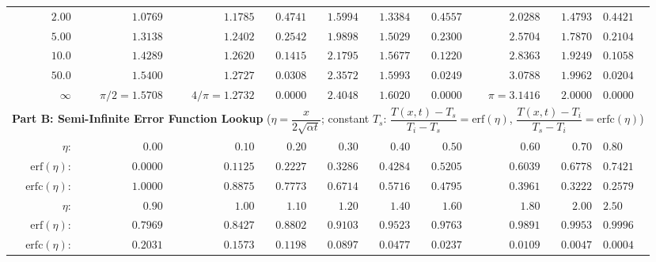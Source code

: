 \begin{minipage}{\linewidth}
\begin{tabularx}{\linewidth}{@{}r r r r r r r r r X@{}}
$2.00$ & $1.0769$ & $1.1785$ & $0.4741$ & $1.5994$ & $1.3384$ & $0.4557$ & $2.0288$ & $1.4793$ & $0.4421$ \\
$5.00$ & $1.3138$ & $1.2402$ & $0.2542$ & $1.9898$ & $1.5029$ & $0.2300$ & $2.5704$ & $1.7870$ & $0.2104$ \\
$10.0$ & $1.4289$ & $1.2620$ & $0.1415$ & $2.1795$ & $1.5677$ & $0.1220$ & $2.8363$ & $1.9249$ & $0.1058$ \\
$50.0$ & $1.5400$ & $1.2727$ & $0.0308$ & $2.3572$ & $1.5993$ & $0.0249$ & $3.0788$ & $1.9962$ & $0.0204$ \\
$\infty$ & $\pi/2=1.5708$ & $4/\pi=1.2732$ & $0.0000$ & $2.4048$ & $1.6020$ & $0.0000$ & $\pi=3.1416$ & $2.0000$ & $0.0000$ \\
\midrule
\multicolumn{10}{l}{\textbf{Part B: Semi-Infinite Error Function Lookup} ($\eta = \dfrac{x}{2\sqrt{\alpha t}}$; constant $T_s$: $\dfrac{T(x,t) - T_s}{T_i - T_s} = \mathrm{erf}(\eta)$, $\dfrac{T(x,t) - T_i}{T_s - T_i} = \mathrm{erfc}(\eta)$)} \\
$\eta$: & $0.00$ & $0.10$ & $0.20$ & $0.30$ & $0.40$ & $0.50$ & $0.60$ & $0.70$ & $0.80$ \\
$\mathrm{erf}(\eta)$: & $0.0000$ & $0.1125$ & $0.2227$ & $0.3286$ & $0.4284$ & $0.5205$ & $0.6039$ & $0.6778$ & $0.7421$ \\
$\mathrm{erfc}(\eta)$: & $1.0000$ & $0.8875$ & $0.7773$ & $0.6714$ & $0.5716$ & $0.4795$ & $0.3961$ & $0.3222$ & $0.2579$ \\
\midrule
$\eta$: & $0.90$ & $1.00$ & $1.10$ & $1.20$ & $1.40$ & $1.60$ & $1.80$ & $2.00$ & $2.50$ \\
$\mathrm{erf}(\eta)$: & $0.7969$ & $0.8427$ & $0.8802$ & $0.9103$ & $0.9523$ & $0.9763$ & $0.9891$ & $0.9953$ & $0.9996$ \\
$\mathrm{erfc}(\eta)$: & $0.2031$ & $0.1573$ & $0.1198$ & $0.0897$ & $0.0477$ & $0.0237$ & $0.0109$ & $0.0047$ & $0.0004$ \\
\bottomrule
\end{tabularx}
\end{minipage}
\par\smallskip

